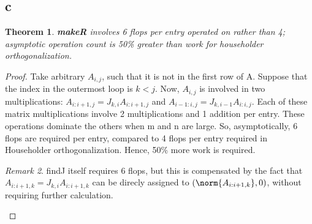 \documentclass[10pt]{amsart}
\newtheorem{thm}{Theorem}[subsection]
\theoremstyle{remark}
\newtheorem{rem}[thm]{Remark}
\begin{document}
\subsection{c}
\begin{thm}
 \textbf{makeR} involves 6 flops per entry operated on rather than 4; asymptotic operation count is 50\% greater than work for householder orthogonalization.
\end{thm}
\begin{proof}
Take arbitrary $A_{i,j}$, such that it is not in the first row of A. Suppose that the index in the outermost loop is $k<j$. Now, $A_{i,j}$ is involved in two multiplications: $A_{i:i+1,j}=J_{k,i}A_{i:i+1,j}$ and $A_{i-1:i,j}=J_{k,i-1}A_{i:i,j}$. Each of these matrix multiplications involve 2 multiplications and 1 addition per entry. These operations dominate the others when m and n are large. So, asymptotically, 6 flops are required per entry, compared to 4 flops per entry required in Householder orthogonalization. Hence, 50\% more work is required.

\begin{rem}
findJ itself requires 6 flops, but this is compensated by the fact that $A_{i:i+1,k} = J_{k,i}A_{i:i+1,k}$ can be direcly assigned to $(\norm{A_{i:i+1,k}}, 0)$, without requiring further calculation.
\end{rem}
\end{proof}

% 
% 
\end{document}
